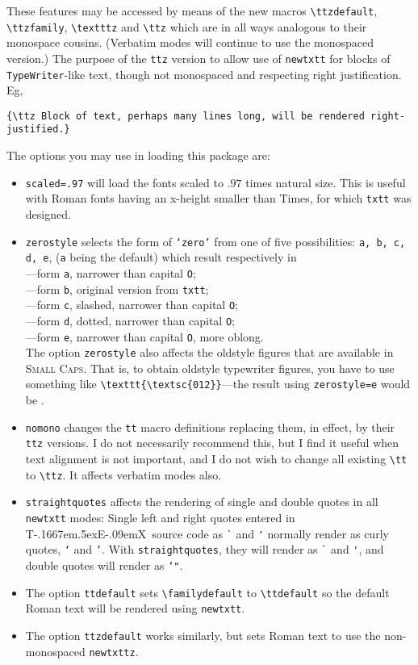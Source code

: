 \documentclass{article}
\makeatletter
\def\TeX{T\kern-.1667em\lower.5ex\hbox{E}\kern-.09emX\@}
\makeatother
\begin{document}
These features may be accessed by means of the new macros \verb|\ttzdefault|, \verb|\ttzfamily|, \verb|\textttz| and  \verb|\ttz| which are in all ways analogous to their monospace cousins. (Verbatim modes will continue to use the monospaced version.) The purpose of the {\tt ttz} version to allow use of \texttt{newtxtt} for blocks of {\tt TypeWriter}-like text, though not monospaced and respecting  right justification. Eg,
\begin{verbatim}
{\ttz Block of text, perhaps many lines long, will be rendered right-justified.}
\end{verbatim}

The options you may use in loading this package are:
\begin{itemize}
\item {\tt scaled=.97} will load the fonts scaled to $.97$ times natural size. This is useful with Roman fonts having an x-height smaller than Times, for which {\tt txtt} was designed.
\item
{\tt zerostyle} selects the form of {\tt `zero'} from one of five possibilities: {\tt a, b, c, d, e}, ({\tt a} being the default) which result respectively in\\[6pt] 
{} ---form {\tt a}, narrower than capital {\tt O};\\
{} ---form {\tt b}, original version from {\tt txtt};\\
{} ---form {\tt c}, slashed, narrower than capital {\tt O};\\
{} ---form {\tt d}, dotted, narrower than capital {\tt O};\\ 
{} ---form {\tt e}, narrower than capital {\tt O}, more oblong.\\
The option {\tt zerostyle} also affects the oldstyle figures that are available in \textsc{Small Caps}. That is, to obtain oldstyle typewriter figures, you have to use something like \verb|\texttt{\textsc{012}}|---the result using {\tt zerostyle=e} would be {}. 
\item
{\tt nomono} changes the {\tt tt} macro definitions replacing them, in effect,  by their {\tt ttz} versions. I do not necessarily recommend this, but I find it useful when text alignment is not important, and I do not wish to change all existing \verb|\tt| to \verb|\ttz|. It affects verbatim modes also.
\item
{\tt straightquotes} affects the rendering of single and double quotes in all {\tt newtxtt} modes:
Single left and right quotes entered in \TeX\ source code as \verb|`| and \verb|'| normally render as curly quotes, {\tt `} and {\tt '}. With {\tt straightquotes}, they will render as \verb|`| and \verb|'|, and double quotes will render as {\tt \char`"}.
\item The option {\tt ttdefault} sets \verb|\familydefault| to \verb|\ttdefault| so the default Roman text will be rendered using {\tt newtxtt}. 
\item The option {\tt ttzdefault} works similarly, but sets Roman text to use the non-monospaced  {\tt newtxttz}.
\end{itemize}
\end{document}
